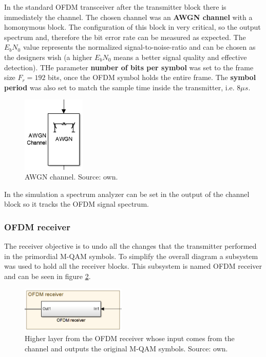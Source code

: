 In the standard OFDM transceiver after the transmitter block there is immediately the channel. The chosen channel was an \textbf{AWGN channel} with a homonymous block. The configuration of this block in very critical, so the output spectrum and, therefore the bit error rate can be measured as expected. The $E_bN_0$ value represents the normalized signal-to-noise-ratio and can be chosen as the designers wish (a higher $E_bN_0$ means a better signal quality and effective detection). THe parameter \textbf{number of bits per symbol} was set to the frame size $F_r = 192$ bits, once the OFDM symbol holds the entire frame. The \textbf{symbol period} was also set to match the sample time inside the transmitter, i.e. $8\mu s$. 

\begin{figure}[h]
\begin{center}
\includegraphics[width=3cm]{images/block4.png}
\caption{AWGN channel. Source: own.}
\label{fig:block4} 
\end{center}
\end{figure}

In the simulation a spectrum analyzer can be set in the output of the channel block so it tracks the OFDM signal spectrum.

\subsubsection{OFDM receiver}

The receiver objective is to undo all the changes that the transmitter performed in the primordial M-QAM symbols. To simplify the overall diagram a subsystem was used to hold all the receiver blocks. This subsystem is named OFDM receiver and can be seen in figure \ref{fig:block5}.


\begin{figure}[h]
\begin{center}
\includegraphics[width=5cm]{images/block5.png}
\caption{Higher layer from the OFDM receiver whose input comes from the channel and outputs the original M-QAM symbols. Source: own.}
\label{fig:block5} 
\end{center}
\end{figure}

